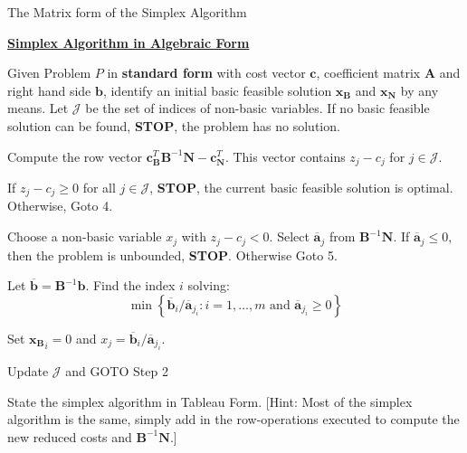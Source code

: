\begin{algorithm}
\caption{The Matrix form of the Simplex Algorithm}
\label{alg:SimplexMatrixForm}
\begin{center}
\begin{minipage}[t]{\textwidth-1em}
\underline{\textbf{Simplex Algorithm in Algebraic Form}}
\begin{enumerate*}
\item Given Problem $P$ in \textbf{standard form} with cost vector $\mathbf{c}$, coefficient matrix $\mathbf{A}$ and right hand side $\mathbf{b}$, identify an initial basic feasible solution $\mathbf{x_B}$ and $\mathbf{x_N}$ by any means. Let $\mathcal{J}$ be the set of indices of non-basic variables. If no basic feasible solution can be found, \textbf{STOP}, the problem has no solution.

\item Compute the row vector $\mathbf{c}_\mathbf{B}^T\mathbf{B}^{-1}\mathbf{N} - \mathbf{c}_\mathbf{N}^T$. This vector contains $z_j - c_j$ for $j \in \mathcal{J}$. 

\item If $z_j - c_j \geq 0$ for all $j \in \mathcal{J}$, \textbf{STOP}, the current basic feasible solution is optimal. Otherwise, Goto 4.

\item Choose a non-basic variable $x_j$ with $z_j-c_j < 0$. Select $\overline{\mathbf{a}}_j$ from $\mathbf{B}^{-1}\mathbf{N}$. If $\overline{\mathbf{a}}_j \leq 0$, then the problem is unbounded, \textbf{STOP}. Otherwise Goto 5.

\item Let $\overline{\mathbf{b}} = \mathbf{B}^{-1}\mathbf{b}$. Find the index $i$ solving: 
\begin{displaymath}
\min\left\{
\overline{\mathbf{b}}_i/\overline{\mathbf{a}}_{j_i} : i = 1,\dots,m \text{ and } \overline{\mathbf{a}}_{j_i}\geq 0
\right\}
\end{displaymath}
 
\item Set $\mathbf{x_B}_i = 0$ and $x_j = \overline{\mathbf{b}}_i/\overline{\mathbf{a}}_{j_i}$. 

\item Update $\mathcal{J}$ and GOTO Step 2
\end{enumerate*}
\end{minipage}
\end{center}
\end{algorithm}

\begin{exercise} State the simplex algorithm in Tableau Form. [Hint: Most of the simplex algorithm is the same, simply add in the row-operations executed to compute the new reduced costs and $\mathbf{B}^{-1}\mathbf{N}$.]
\end{exercise}

